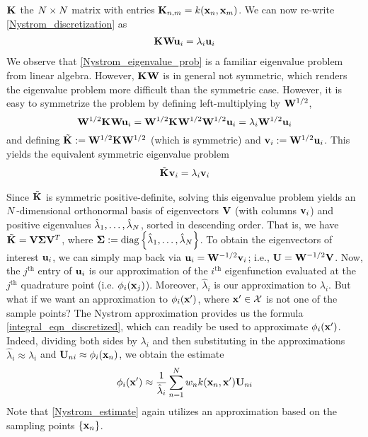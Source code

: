 \documentclass[12pt]{article}
\begin{document}
$\kerMat$ the $\Ndesign \times \Ndesign$ matrix with entries $\kerMat[\designIdx, m] = \GPKer(\bx_{\designIdx}, \bx_m)$. We can now re-write \ref{Nystrom_discretization} as 
\begin{align}
\kerMat \bW \bu_i = \lambda_i \bu_i \label{Nystrom_eigenvalue_prob}
\end{align}
We observe that \ref{Nystrom_eigenvalue_prob} is a familiar eigenvalue problem from linear algebra. However, $\kerMat \bW$ is in general not symmetric, which renders the 
eigenvalue problem more difficult than the symmetric case. However, it is easy to symmetrize the problem by defining left-multiplying by $\bW^{1/2}$,
\[\bW^{1/2} \kerMat \bW \bu_i = \bW^{1/2} \kerMat \bW^{1/2} \bW^{1/2} \bu_i= \lambda_i \bW^{1/2} \bu_i\]
and defining $\tilde{\kerMat} := \bW^{1/2} \kerMat \bW^{1/2}$ (which is symmetric) and $\bv_i := \bW^{1/2} \bu_i$. This yields the equivalent symmetric eigenvalue problem 
\begin{align}
\tilde{\kerMat} \bv_i = \lambda_i \bv_i
\end{align}

Since $\tilde{\kerMat}$ is symmetric positive-definite, solving this eigenvalue problem yields an $\Ndesign$-dimensional orthonormal basis of 
eigenvectors $\bV$ (with columns $\bv_i$) and positive eigenvalues $\hat{\lambda}_1, \dots, \hat{\lambda}_{\Ndesign}$, sorted in descending 
order. That is, we have $\tilde{\kerMat} = \bV \Sig \bV^T$, where $\Sig := \text{diag}\left\{\hat{\lambda}_1, \dots, \hat{\lambda}_{\Ndesign} \right\}$. 
To obtain the eigenvectors of interest $\bu_i$, we can simply map back via $\bu_i = \bW^{-1/2}\bv_i$; i.e., $\bU = \bW^{-1/2}\bV$. Now, 
the $j^{\text{th}}$ entry of $\bu_i$ is our approximation of the $i^{\text{th}}$ eigenfunction evaluated at the $j^{\text{th}}$ quadrature
point (i.e. $\phi_i(\bx_j)$). Moreover, $\hat{\lambda}_i$ is our approximation to $\lambda_i$. But what if we want an approximation to 
$\phi_i(\bx^\prime)$, where $\bx^\prime \in \inputSpace$ is not one of the sample points? The Nystrom approximation provides us the formula 
\ref{integral_eqn_discretized}, which can readily be used to approximate $\phi_i(\bx^\prime)$. Indeed, dividing both sides by $\lambda_i$ and then substituting in the 
approximations $\hat{\lambda}_i \approx \lambda_i$ and $ \bU_{\designIdx i} \approx \phi_i(\bx_\designIdx)$, we obtain the estimate
\begin{align}
\phi_i(\bx^\prime) \approx \frac{1}{\hat{\lambda}_i } \sum_{\designIdx = 1}^{\Ndesign} w_{\designIdx} \GPKer(\bx_{\designIdx}, \bx^\prime)  \bU_{\designIdx i} \label{Nystrom_estimate}
\end{align}
Note that \ref{Nystrom_estimate} again utilizes an approximation based on the sampling points $\{\bx_{\designIdx}\}$. 
\end{document}
